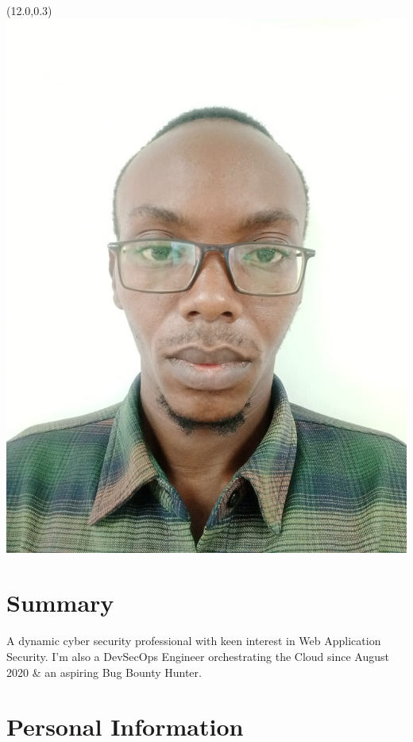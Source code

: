 \documentclass[11pt,a4paper]{moderncv}
\begin{document}
\hskip-2.5cm\makecvtitle
\begin{textblock}{0}(12.0,0.3)
\includegraphics[scale=0.13]{alex-kyalo.jpeg}
\end{textblock}

\section{Summary}
A dynamic cyber security professional with keen interest in Web Application Security. I'm also a DevSecOps Engineer orchestrating the Cloud since August 2020 \& an aspiring Bug Bounty Hunter.


\section{Personal Information}
\end{document}
